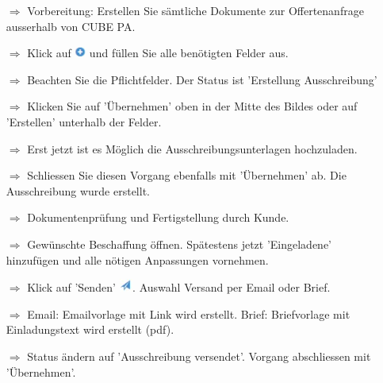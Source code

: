\documentclass{article}
\begin{document}
\begin{multicols}{2}

\begin{tcolorbox}[colback=blue!5,colframe=blue!40!black,title=(1) Neue Beschaffung initialisieren]
\begin{itemize}
  \item[$\Longrightarrow$] Vorbereitung: Erstellen Sie sämtliche Dokumente zur Offertenanfrage ausserhalb von CUBE PA.
  \item[$\Longrightarrow$] Klick auf \includegraphics[height=10pt]{Icons/Plussymbol.jpg} und füllen Sie alle benötigten Felder aus.
  \item[$\Longrightarrow$] Beachten Sie die Pflichtfelder. Der Status ist 'Erstellung Ausschreibung'
  \item[$\Longrightarrow$] Klicken Sie auf 'Übernehmen' oben in der Mitte des Bildes oder auf 'Erstellen' unterhalb der Felder.
	\item[$\Longrightarrow$] Erst jetzt ist es Möglich die Ausschreibungsunterlagen hochzuladen.
  \item[$\Longrightarrow$] Schliessen Sie diesen Vorgang ebenfalls mit 'Übernehmen' ab. Die Ausschreibung wurde erstellt.
	\item[$\Longrightarrow$] Dokumentenprüfung und Fertigstellung durch Kunde.
\end{itemize}
\end{tcolorbox}




\begin{tcolorbox}[colback=blue!5,colframe=blue!40!black,title=(2) Offertanfrage versenden]
\begin{itemize}
  \item[$\Longrightarrow$] Gewünschte Beschaffung öffnen. Spätestens jetzt 'Eingeladene' hinzufügen und alle nötigen Anpassungen vornehmen.
	\item[$\Longrightarrow$] Klick auf 'Senden' \includegraphics[height=12pt]{Icons/Versandsymbol.jpg}. Auswahl Versand per Email oder Brief.
  \item[$\Longrightarrow$] Email: Emailvorlage mit Link wird erstellt. Brief: Briefvorlage mit Einladungstext wird erstellt (pdf).
  \item[$\Longrightarrow$] Status ändern auf 'Ausschreibung versendet'. Vorgang abschliessen mit 'Übernehmen'.
\end{itemize}
\end{tcolorbox}


\end{multicols}
\end{document}
